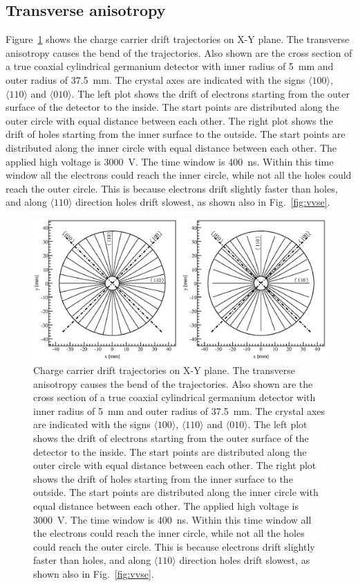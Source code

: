 \subsection{Transverse anisotropy}
\label{subsec:long}
Figure~\ref{fig:trjs} shows the charge carrier drift trajectories on X-Y plane. The transverse anisotropy causes the bend of the trajectories. Also shown are the cross section of a true coaxial cylindrical germanium detector with inner radius of 5~mm and outer radius of 37.5~mm. The crystal axes are indicated with the signs $\langle 100 \rangle$, $\langle 110 \rangle$ and $\langle 010 \rangle$. The left plot shows the drift of electrons starting from the outer surface of the detector to the inside. The start points are distributed along the outer circle with equal distance between each other. The right plot shows the drift of holes starting from the inner surface to the outside. The start points are distributed along the inner circle with equal distance between each other. The applied high voltage is 3000~V. The time window is 400~ns. Within this time window all the electrons could reach the inner circle, while not all the holes could reach the outer circle.  This is because electrons drift slightly faster than holes, and along $\langle 110 \rangle$ direction holes drift slowest, as shown also in Fig.~\ref{fig:vvse}.
\begin{figure}[tbhp]
  \centering
  \includegraphics[width=1.0\textwidth]{trjs}
  \caption{Charge carrier drift trajectories on X-Y plane. The     transverse anisotropy causes the bend of the trajectories. Also     shown are the cross section of a true coaxial cylindrical     germanium detector with inner radius of 5~mm and outer radius of     37.5~mm. The crystal axes are indicated with the signs $\langle     100 \rangle$, $\langle 110 \rangle$ and $\langle 010 \rangle$. The     left plot shows the drift of electrons starting from the outer     surface of the detector to the inside. The start points are     distributed along the outer circle with equal distance between     each other. The right plot shows the drift of holes starting from     the inner surface to the outside. The start points are distributed     along the inner circle with equal distance between each other. The     applied high voltage is 3000~V. The time window is 400~ns. Within     this time window all the electrons could reach the inner circle,     while not all the holes could reach the outer circle. This is     because electrons drift slightly faster than holes, and along     $\langle 110 \rangle$ direction holes drift slowest, as shown also     in Fig.~\ref{fig:vvse}.}
  \label{fig:trjs}
\end{figure}


